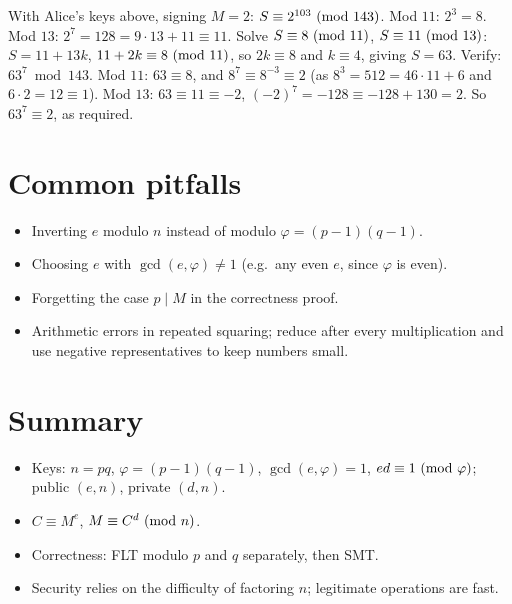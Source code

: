 \begin{example}
With Alice's keys above, signing $M = 2$: $S \equiv 2^{103} \ (\mathrm{mod}\ 143)$. Mod $11$: $2^{3} = 8$.
Mod $13$: $2^{7} = 128 = 9\cdot 13 + 11 \equiv 11$. Solve $S\equiv 8 \ (\mathrm{mod}\ 11)$,
$S \equiv 11 \ (\mathrm{mod}\ 13)$: $S = 11 + 13k$, $11 + 2k \equiv 8 \ (\mathrm{mod}\ 11)$, so $2k \equiv 8$ and
$k \equiv 4$, giving $S = 63$. Verify: $63^7 \bmod 143$. Mod $11$: $63 \equiv 8$, and
$8^7 \equiv 8^{-3} \equiv 2$ (as $8^3 = 512 = 46\cdot 11 + 6$ and $6\cdot 2 = 12 \equiv 1$).
Mod $13$: $63 \equiv 11 \equiv -2$, $(-2)^7 = -128 \equiv -128 + 130 = 2$. So $63^7 \equiv 2$,
as required.
\end{example}

\section{Common pitfalls}
\begin{itemize}
  \item Inverting $e$ modulo $n$ instead of modulo $\varphi = (p-1)(q-1)$.
  \item Choosing $e$ with $\gcd(e,\varphi) \ne 1$ (e.g.\ any even $e$, since $\varphi$ is even).
  \item Forgetting the case $p \mid M$ in the correctness proof.
  \item Arithmetic errors in repeated squaring; reduce after every multiplication and use
        negative representatives to keep numbers small.
\end{itemize}

\section{Summary}
\begin{itemize}
  \item Keys: $n = pq$, $\varphi = (p-1)(q-1)$, $\gcd(e,\varphi) = 1$, $ed \equiv 1 \ (\mathrm{mod}\ \varphi)$;
        public $(e,n)$, private $(d,n)$.
  \item $C \equiv M^e$, $M \equiv C^d \ (\mathrm{mod}\ n)$.
  \item Correctness: FLT modulo $p$ and $q$ separately, then SMT.
  \item Security relies on the difficulty of factoring $n$; legitimate operations are fast.
\end{itemize}

